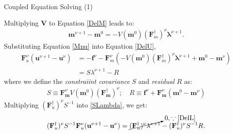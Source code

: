 \documentclass[
	xcolor=dvipsnames,
	aspectratio=169,	
	10pt, 
	]{beamer}
\begin{document}
\begin{frame}{Coupled Equation Solving (1)}
	\begin{block}{}
		Multiplying \textbf V to Equation \eqref{DelM} leads to:	
		\begin{align}
			\mathbf{m}^{\nu+1}-\mathbf{m}^0=-V(\mathbf m^0)(\mathbf{F}_m^\dagger)^\nu\mathbf\lambda^{\nu+1}.\label{Mnu}
		\end{align}
		Substituting Equation \eqref{Mnu} into Equation \eqref{DelU}, 
		\begin{align}
			\mathbf F^\nu_u(\mathbf u^{\nu+1}-\mathbf u^\nu) &= - \mathbf f^\nu - \mathbf F^\nu_m (-V(\mathbf m^0)(\mathbf{F}_m^\dagger)^\nu\mathbf\lambda^{\nu+1} +\mathbf{m}^0-\mathbf{m}^\nu  )\nonumber\\
			&=  S\lambda^{\nu+1}  - R\label{SLambda}
		\end{align}
		where we define the \textit{constraiint covariance} $S$ and \textit{residual} $R$ as:
		\begin{align}
		S\equiv \mathbf{F}_\mathbf{m}^\nu V(\mathbf m^0)(\mathbf{F}_\mathbf{m}^\dagger )^\nu;\quad R\equiv \mathbf f^\nu + \mathbf{F}_\mathbf{m}^\nu(\mathbf{m}^0-\mathbf{m}^\nu)
		\end{align}
		  Multiplying $(\mathbf{F}_u^\dagger)^\nu S^{-1}$  into \eqref{SLambda}, we get:
		\begin{align}
			(\mathbf{F}_u^\dagger)^\nu S^{-1}\mathbf F^\nu_u(\mathbf u^{\nu+1}-\mathbf u^\nu) = \cancelto{0,\because \eqref{DelL}}{(\mathbf F_u^\dagger)^\nu\mathbf \lambda^{\nu+1}}-(\mathbf{F}_u^\dagger)^\nu S^{-1}R.
		\end{align}
	\end{block}
\end{frame}
\end{document}
